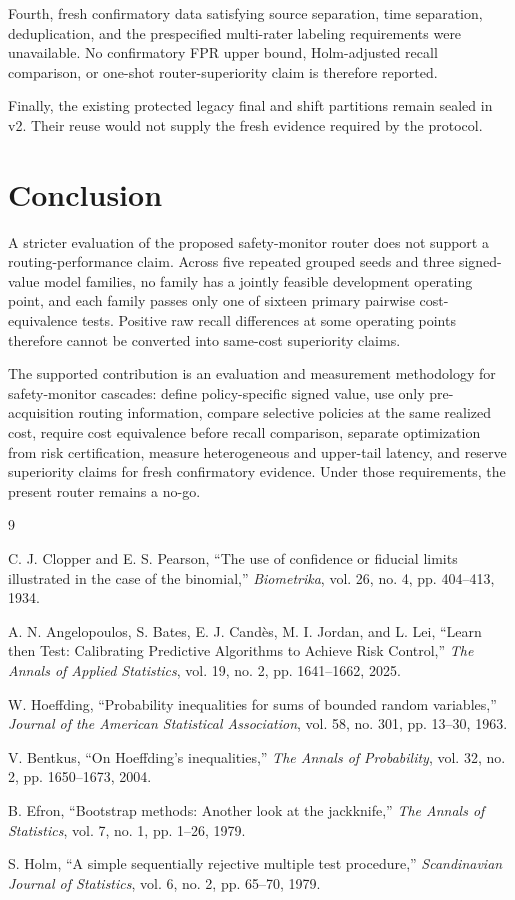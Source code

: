 \documentclass[11pt]{article}
\begin{document}
Fourth, fresh confirmatory data satisfying source separation, time
separation, deduplication, and the prespecified multi-rater labeling
requirements were unavailable. No confirmatory FPR upper bound,
Holm-adjusted recall comparison, or one-shot router-superiority
claim is therefore reported.

Finally, the existing protected legacy final and shift partitions
remain sealed in v2. Their reuse would not supply the fresh evidence
required by the protocol.

\section{Conclusion}

A stricter evaluation of the proposed safety-monitor router does
not support a routing-performance claim. Across five repeated
grouped seeds and three signed-value model families, no family has
a jointly feasible development operating point, and each family
passes only one of sixteen primary pairwise cost-equivalence tests.
Positive raw recall differences at some operating points therefore
cannot be converted into same-cost superiority claims.

The supported contribution is an evaluation and measurement
methodology for safety-monitor cascades: define policy-specific
signed value, use only pre-acquisition routing information, compare
selective policies at the same realized cost, require cost
equivalence before recall comparison, separate optimization from
risk certification, measure heterogeneous and upper-tail latency,
and reserve superiority claims for fresh confirmatory evidence.
Under those requirements, the present router remains a no-go.

\begin{thebibliography}{9}

C. J. Clopper and E. S. Pearson,
``The use of confidence or fiducial limits illustrated in the
case of the binomial,''
\textit{Biometrika},
vol. 26, no. 4, pp. 404--413, 1934.


A. N. Angelopoulos, S. Bates, E. J. Cand\`es,
M. I. Jordan, and L. Lei,
``Learn then Test: Calibrating Predictive Algorithms to Achieve
Risk Control,''
\textit{The Annals of Applied Statistics},
vol. 19, no. 2, pp. 1641--1662, 2025.

W. Hoeffding,
``Probability inequalities for sums of bounded random variables,''
\textit{Journal of the American Statistical Association},
vol. 58, no. 301, pp. 13--30, 1963.

V. Bentkus,
``On Hoeffding's inequalities,''
\textit{The Annals of Probability},
vol. 32, no. 2, pp. 1650--1673, 2004.

B. Efron,
``Bootstrap methods: Another look at the jackknife,''
\textit{The Annals of Statistics},
vol. 7, no. 1, pp. 1--26, 1979.

S. Holm,
``A simple sequentially rejective multiple test procedure,''
\textit{Scandinavian Journal of Statistics},
vol. 6, no. 2, pp. 65--70, 1979.

\end{thebibliography}
\end{document}
